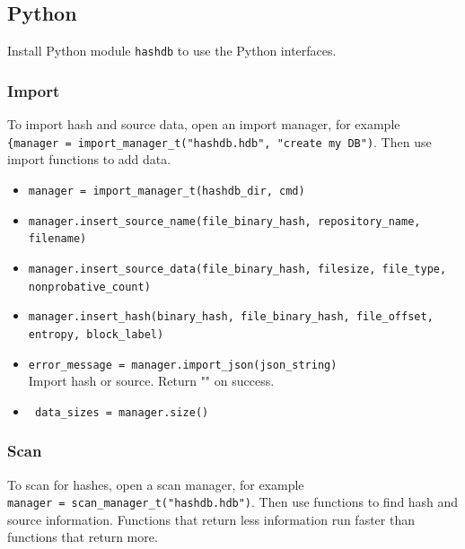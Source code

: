 \documentclass[11pt,fleqn]{article} %
\begin{document}
\subsection{Python}
Install Python module \verb+hashdb+ to use the \hdb Python interfaces.

\subsubsection{Import}
To import hash and source data, open an import manager, for example\\
\verb+{manager = import_manager_t("hashdb.hdb", "create my DB")+. Then use import functions to add data.

\begin{itemize}
\item \verb+manager = import_manager_t(hashdb_dir, cmd)+
\item \verb+manager.insert_source_name(file_binary_hash, repository_name, filename)+
\item \verb+manager.insert_source_data(file_binary_hash, filesize, file_type,+\\
\verb+nonprobative_count)+
\item \verb+manager.insert_hash(binary_hash, file_binary_hash, file_offset,+\\
\verb+entropy, block_label)+
\item \verb+error_message = manager.import_json(json_string)+\\
Import hash or source. Return "" on success.
\item \verb+ data_sizes = manager.size()+
\end{itemize}

\subsubsection{Scan}
To scan for hashes, open a scan manager, for example\\
\verb+manager = scan_manager_t("hashdb.hdb")+. Then use functions to find hash and source information. Functions that return less information run faster than functions that return more.
\end{document}
